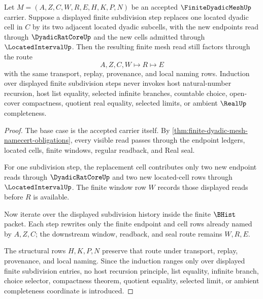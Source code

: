 \begin{theorem}
\label{thm:finite-dyadic-mesh-induction}
Let $M=(A,Z,C,W,R,E,H,K,P,N)$ be an accepted $\FiniteDyadicMeshUp$ carrier. Suppose a displayed finite subdivision step replaces one located dyadic cell in $C$ by its two adjacent located dyadic subcells, with the new endpoints read through $\DyadicRatCoreUp$ and the new cells admitted through $\LocatedIntervalUp$. Then the resulting finite mesh read still factors through the route
$$
A,Z,C,W \longmapsto R \longmapsto E
$$
with the same transport, replay, provenance, and local naming rows. Induction over displayed finite subdivision steps never invokes host natural-number recursion, host list equality, selected infinite branches, countable choice, open-cover compactness, quotient real equality, selected limits, or ambient $\RealUp$ completeness.
\end{theorem}
\begin{proof}
The base case is the accepted carrier itself. By \autoref{thm:finite-dyadic-mesh-namecert-obligations}, every visible read passes through the endpoint ledgers, located cells, finite windows, regular readback, and Real seal.

For one subdivision step, the replacement cell contributes only two new endpoint reads through $\DyadicRatCoreUp$ and two new located-cell rows through $\LocatedIntervalUp$. The finite window row $W$ records those displayed reads before $R$ is available.

Now iterate over the displayed subdivision history inside the finite $\BHist$ packet. Each step rewrites only the finite endpoint and cell rows already named by $A,Z,C$; the downstream window, readback, and seal route remains $W,R,E$.

The structural rows $H,K,P,N$ preserve that route under transport, replay, provenance, and local naming. Since the induction ranges only over displayed finite subdivision entries, no host recursion principle, list equality, infinite branch, choice selector, compactness theorem, quotient equality, selected limit, or ambient completeness coordinate is introduced.
\end{proof}



